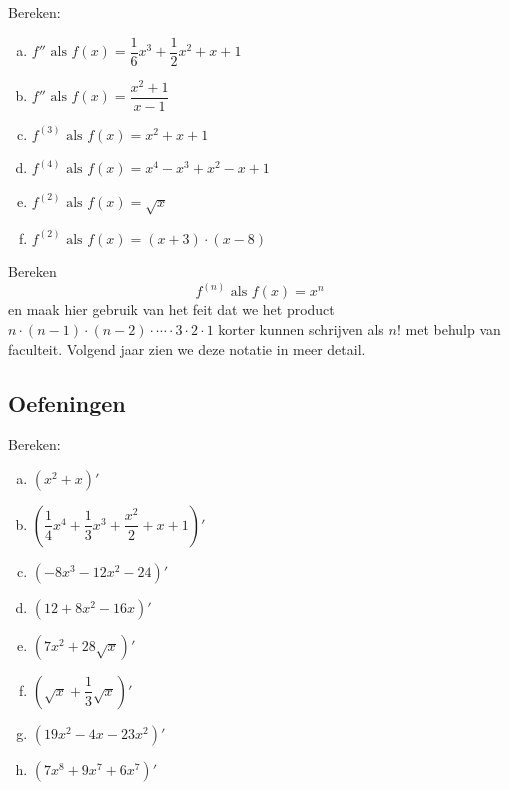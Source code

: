 \documentclass[a4paper,12pt,twoside]{article}
\begin{document}
\begin{oefening}
  Bereken:
  \begin{multicols}{2}
  \begin{enumerate}[(a)]
  \itemsep1em
  \item $f'' \mbox{ als } f(x)=\dfrac{1}{6}x^3+\dfrac{1}{2}x^2+x+1$
  \item $f'' \mbox{ als } f(x)=\dfrac{x^2+1}{x-1}$
  \item $f^{(3)} \mbox{ als } f(x)=x^2+x+1$
  \item $f^{(4)} \mbox{ als } f(x)=x^4-x^3+x^2-x+1$
  \item $f^{(2)} \mbox{ als } f(x)=\sqrt{x}$
  \item $f^{(2)} \mbox{ als } f(x)=(x+3)\cdot(x-8)$
  \end{enumerate}
  \end{multicols}
\end{oefening}

\begin{oefening}
Bereken
$$f^{(n)} \mbox{ als } f(x)=x^n$$
en maak hier gebruik van het feit dat we het product $n\cdot(n-1)\cdot(n-2)\cdot \cdots \cdot 3\cdot 2\cdot 1$ korter kunnen schrijven als $n!$ met behulp van faculteit. Volgend jaar zien we deze notatie in meer detail.
\end{oefening}

\needspace{3cm}
\subsection{Oefeningen}

\begin{oefening}
  Bereken:
  \begin{multicols}{2}
  \begin{enumerate}[(a)]
  \itemsep1em
  \item $\displaystyle\left( x^2+x \right)'$
  \item $\displaystyle\left( \dfrac{1}{4}x^4+\dfrac{1}{3}x^3+\dfrac{x^2}{2}+x+1 \right)'$
  \item $\displaystyle\left( -8x^3-12x^2-24 \right)'$
  \item $\displaystyle\left( 12+8x^2-16x \right)'$
  \item $\displaystyle\left( 7x^2+28\sqrt{x} \right)'$
  \item $\displaystyle\left( \sqrt{x}+\dfrac{1}{3}\sqrt{x} \right)'$
  \item $\displaystyle\left( 19x^2-4x-23x^2 \right)'$
  \item $\displaystyle\left( 7x^8+9x^7+6x^7 \right)'$
  \end{enumerate}
  \end{multicols}
\end{oefening}
\end{document}
